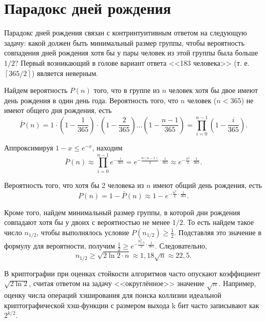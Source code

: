 \section{Парадокс дней рождения}\label{section-birthday-padradox}

Парадокс дней рождения связан с контринтуитивным ответом на следующую задачу: какой должен быть минимальный размер группы, чтобы вероятность совпадения дней рождения хотя бы у пары человек из этой группы была больше $1 / 2$? Первый возникающий в голове вариант ответа <<183 человека>> (т. е. $\left\lceil 365 / 2 \right\rceil$) является неверным.

Найдем вероятность $P(n)$ того, что в группе из $n$ человек хотя бы двое имеют день рождения в один день года. Вероятность того, что $n$ человек ($n < 365$) не имеют общего дня рождения, есть
\[
    \bar{P}(n) = 1 \cdot \left( 1 - \frac{1}{365} \right) \cdot \left(1 - \frac{2}{365} \right)  \dots  \left( 1 - \frac{n-1}{365} \right) = \prod\limits_{i=0}^{n-1} \left( 1 - \frac{i}{365} \right).
\]

Аппроксимируя $1-x \leq e^{-x}$, находим
    \[ \bar{P}(n) \approx \prod\limits_{i=0}^{n-1} e^{-\frac{i}{365}} = e^{-\frac{n(n-1)}{2} \cdot \frac{1}{365}} \approx e^{-\frac{n^2}{2} \cdot \frac{1}{365}}. \]

Вероятность того, что хотя бы 2 человека из $n$ имеют общий день рождения, есть
    \[ P(n) = 1 - \bar{P}(n) \approx 1 -  e^{-\frac{n^2}{2} \cdot \frac{1}{365}}. \]

Кроме того, найдем минимальный размер группы, в которой дни рождения совпадают хотя бы у двоих с вероятностью не менее $1/2$. То есть найдем такое число $n_{1/2}$, чтобы выполнялось условие $P(n_{1/2}) \geq \frac{1}{2}$. Подставляя это значение в формулу для вероятности, получим $\frac{1}{2} \geq e^{-\frac{n_{1/2}^2}{2} \cdot \frac{1}{365}}$. Следовательно,
	\[n_{1/2} \geq \sqrt{2 \ln 2 \cdot n} \approx 1,18 \sqrt{ n } \approx 22,5.\]
	
В криптографии при оценках стойкости алгоритмов часто опускают коэффициент $\sqrt{2 \ln 2}$, считая ответом на задачу <<округлённое>> значение $\sqrt{ n }$. Например, оценку числа операций хэширования для поиска коллизии идеальной криптографической хэш-функции с размером выхода k бит часто записывают как $2^{k/2}$.
